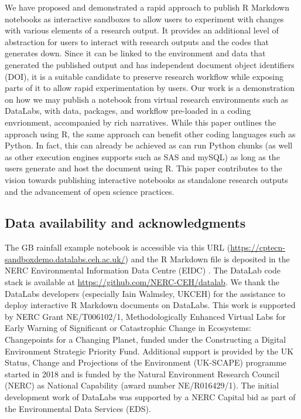 We have proposed and demonstrated a rapid approach to publish R Markdown
notebooks as interactive sandboxes to allow users to experiment with
changes with various elements of a research output. It provides an
additional level of abstraction for users to interact with research
outputs and the codes that generates down. Since it can be linked to the
environment and data that generated the published output and has
independent document object identifiers (DOI), it is a suitable
candidate to preserve research workflow while exposing parts of it to
allow rapid experimentation by users. Our work is a demonstration on how
we may publish a notebook from virtual research environments such as
DataLabs, with data, packages, and workflow pre-loaded in a coding
envrionment, accompanied by rich narratives. While this paper outlines
the approach using R, the same approach can benefit other coding
languages such as Python. In fact, this can already be achieved as
 can run Python chunks (as well as other execution
engines  supports such as SAS and mySQL) as long as the
users generate and host the document using R. This paper contributes to
the vision towards publishing interactive notebooks as standalone
research outputs and the advancement of open science practices.

\hypertarget{data-availability-and-acknowledgments}{%
\subsection{Data availability and
acknowledgments}\label{data-availability-and-acknowledgments}}

The GB rainfall example notebook is accessible via this URL
(\url{https://cptecn-sandboxdemo.datalabs.ceh.ac.uk/}) and the R
Markdown file is deposited in the NERC Environmental Information Data
Centre (EIDC) \citep{EIDC}. The DataLab code stack is available at
\url{https://github.com/NERC-CEH/datalab}. We thank the DataLabs
developers (especially Iain Walmsley, UKCEH) for the assistance to
deploy interactive R Markdown documents on DataLabs. This work is
supported by NERC Grant NE/T006102/1, Methodologically Enhanced Virtual
Labs for Early Warning of Significant or Catastrophic Change in
Ecosystems: Changepoints for a Changing Planet, funded under the
Constructing a Digital Environment Strategic Priority Fund. Additional
support is provided by the UK Status, Change and Projections of the
Environment (UK-SCAPE) programme started in 2018 and is funded by the
Natural Environment Research Council (NERC) as National Capability
(award number NE/R016429/1). The initial development work of DataLabs
was supported by a NERC Capital bid as part of the Environmental Data
Services (EDS).

